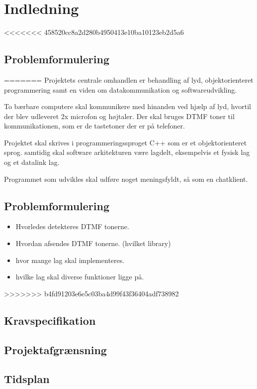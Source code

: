 \section{Indledning}
<<<<<<< 458520cc8a2d280b4950413e10ba10123eb2d5a6
\subsection{Problemformulering}
=======
Projektets centrale omhandlen er behandling af lyd, objektorienteret programmering samt en viden om datakommunikation og softwareudvikling.

To bærbare computere skal kommunikere med hinanden ved hjælp af lyd, hvortil der blev udleveret 2x microfon og højtaler.
Der skal bruges DTMF toner til kommunikationen, som er de tastetoner der er på telefoner.

Projektet skal skrives i programmeringssproget C++ som er et objektorienteret sprog.
samtidig skal software arkitekturen være lagdelt, eksempelvis et fysisk lag og et datalink lag.

Programmet som udvikles skal udføre noget meningsfyldt, så som en chatklient.
\subsection{Problemformulering}



\begin{itemize}
	\item Hvorledes detekteres DTMF tonerne.
	\item Hvordan afsendes DTMF tonerne. (hvilket library)
	\item hvor mange lag skal implementeres.
	\item hvilke lag skal diverse funktioner ligge på.
\end{itemize}

 

>>>>>>> b4fd91203e6e5c03ba4d99f43f36404adf738982
\subsection{Kravspecifikation}
\subsection{Projektafgrænsning}
\subsection{Tidsplan}